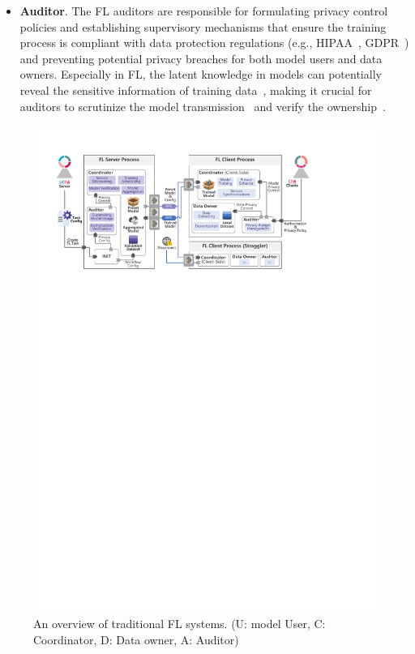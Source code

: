\begin{itemize}
    \item \textbf{Auditor}. The FL auditors are responsible for formulating privacy control policies and establishing supervisory mechanisms that ensure the training process is compliant with data protection regulations (e.g., HIPAA~\cite{act1996health}, GDPR~\cite{voigt2017eu}) and preventing potential privacy breaches for both model users and data owners. Especially in FL, the latent knowledge in models can potentially reveal the sensitive information of training data~\cite{wang2019beyond, zhu2019deep, jin2021cafe}, making it crucial for auditors to scrutinize the model transmission~\cite{wei2021gradient, li2022auditing} and verify the ownership~\cite{tekgul2021waffle, shao2022fedtracker}.
\end{itemize}

\begin{figure}[t]
    \centering
    \includegraphics[width=\linewidth]{fig/fl_frame.pdf} %
    \caption{An overview of traditional FL systems. (U: model User, C: Coordinator, D: Data owner, A: Auditor)}
    \label{fig:fl}
  \end{figure}


